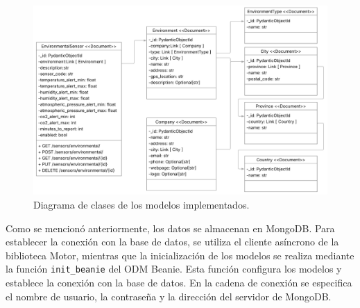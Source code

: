 \begin{figure}[H]
    \centering
    \includegraphics[width=.95\textwidth]{./Images/18.png}
    \caption{Diagrama de clases de los modelos implementados.}
    \label{fig:diagrama de clases}
\end{figure}





Como se mencionó anteriormente, los datos se almacenan en MongoDB. Para
establecer la conexión con la base de datos, se utiliza el cliente asíncrono de
la biblioteca Motor, mientras que la inicialización de los modelos se realiza
mediante la función \texttt{init\_beanie} del ODM Beanie. Esta función
configura los modelos y establece la conexión con la base de datos. En la
cadena de conexión se especifica el nombre de usuario, la contraseña y la
dirección del servidor de MongoDB.

